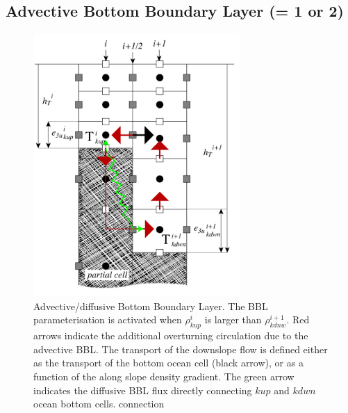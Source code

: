 \subsection   {Advective Bottom Boundary Layer  (= 1 or 2)}
\label{TRA_bbl_adv}


\begin{figure}[!t] 	\begin{center}
\includegraphics[width=0.7\textwidth]{./TexFiles/Figures/Fig_BBL_adv.pdf}
\caption{ 	\label{Fig_bbl}  
Advective/diffusive Bottom Boundary Layer. The BBL parameterisation is 
activated when $\rho^i_{kup}$ is larger than $\rho^{i+1}_{kdnw}$. 
Red arrows indicate the additional overturning circulation due to the advective BBL. 
The transport of the downslope flow is defined either as the transport of the bottom 
ocean cell (black arrow), or as a function of the along slope density gradient. 
The green arrow indicates the diffusive BBL flux directly connecting $kup$ and $kdwn$
ocean bottom cells.
connection}
\end{center}   \end{figure}


